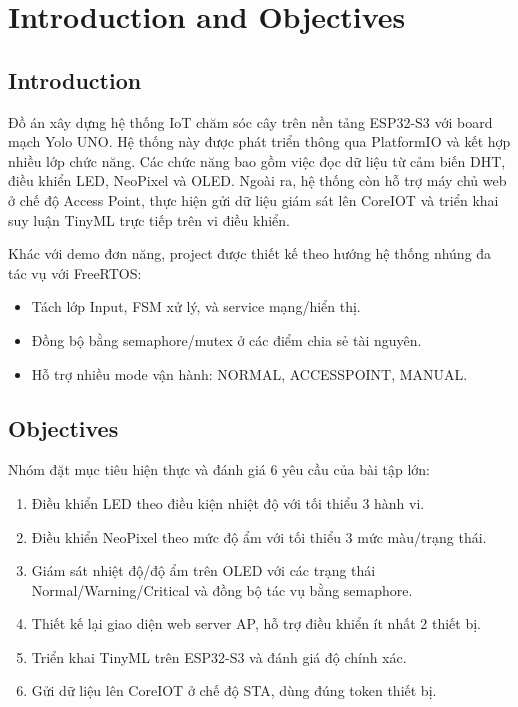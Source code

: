 \section{Introduction and Objectives}
\label{sec:introduction}

\subsection{Introduction}
Đồ án xây dựng hệ thống IoT chăm sóc cây trên nền tảng ESP32-S3 với board mạch Yolo UNO. Hệ thống này được phát triển thông qua PlatformIO và kết hợp nhiều lớp chức năng. Các chức năng bao gồm việc đọc dữ liệu từ cảm biến DHT, điều khiển LED, NeoPixel và OLED. Ngoài ra, hệ thống còn hỗ trợ máy chủ web ở chế độ Access Point, thực hiện gửi dữ liệu giám sát lên CoreIOT và triển khai suy luận TinyML trực tiếp trên vi điều khiển.

Khác với demo đơn năng, project được thiết kế theo hướng hệ thống nhúng đa tác vụ với FreeRTOS:
\begin{itemize}
    \item Tách lớp Input, FSM xử lý, và service mạng/hiển thị.
    \item Đồng bộ bằng semaphore/mutex ở các điểm chia sẻ tài nguyên.
    \item Hỗ trợ nhiều mode vận hành: NORMAL, ACCESSPOINT, MANUAL.
\end{itemize}

\subsection{Objectives}
Nhóm đặt mục tiêu hiện thực và đánh giá 6 yêu cầu của bài tập lớn:
\begin{enumerate}
    \item Điều khiển LED theo điều kiện nhiệt độ với tối thiểu 3 hành vi.
    \item Điều khiển NeoPixel theo mức độ ẩm với tối thiểu 3 mức màu/trạng thái.
    \item Giám sát nhiệt độ/độ ẩm trên OLED với các trạng thái Normal/Warning/Critical và đồng bộ tác vụ bằng semaphore.
    \item Thiết kế lại giao diện web server AP, hỗ trợ điều khiển ít nhất 2 thiết bị.
    \item Triển khai TinyML trên ESP32-S3 và đánh giá độ chính xác.
    \item Gửi dữ liệu lên CoreIOT ở chế độ STA, dùng đúng token thiết bị.
\end{enumerate}

